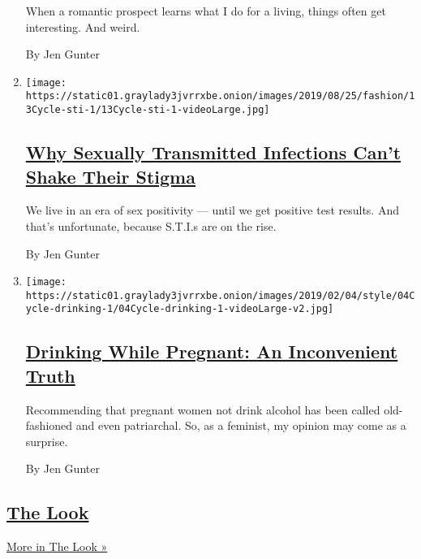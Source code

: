 \begin{enumerate}
  When a romantic prospect learns what I do for a living, things often
  get interesting. And weird.

  By Jen Gunter
\item
  \texttt{[image: https://static01.graylady3jvrrxbe.onion/images/2019/08/25/fashion/13Cycle-sti-1/13Cycle-sti-1-videoLarge.jpg]}

  \hypertarget{why-sexually-transmitted-infections-cant-shake-their-stigma}{%
  \subsection{\texorpdfstring{\href{/2019/08/13/style/sti-stigma-sexual-transmitted-infections.html}{Why
  Sexually Transmitted Infections Can't Shake Their
  Stigma}}{Why Sexually Transmitted Infections Can't Shake Their Stigma}}\label{why-sexually-transmitted-infections-cant-shake-their-stigma}}

  We live in an era of sex positivity --- until we get positive test
  results. And that's unfortunate, because S.T.I.s are on the rise.

  By Jen Gunter
\item
  \texttt{[image: https://static01.graylady3jvrrxbe.onion/images/2019/02/04/style/04Cycle-drinking-1/04Cycle-drinking-1-videoLarge-v2.jpg]}

  \hypertarget{drinking-while-pregnant-an-inconvenient-truth}{%
  \subsection{\texorpdfstring{\href{/2019/02/05/style/drinking-while-pregnant.html}{Drinking
  While Pregnant: An Inconvenient
  Truth}}{Drinking While Pregnant: An Inconvenient Truth}}\label{drinking-while-pregnant-an-inconvenient-truth}}

  Recommending that pregnant women not drink alcohol has been called
  old-fashioned and even patriarchal. So, as a feminist, my opinion may
  come as a surprise.

  By Jen Gunter
\end{enumerate}

\hypertarget{the-look}{%
\subsection{\texorpdfstring{\href{/column/the-look}{The
Look}}{The Look}}\label{the-look}}

\href{/column/the-look}{More in The Look »}

